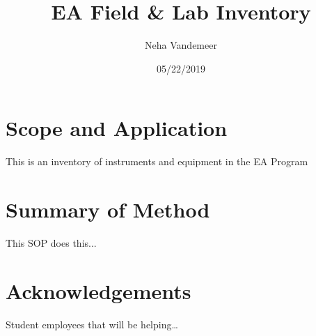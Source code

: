\documentclass[12pt]{../SOP4_alpha}\usepackage[]{graphicx}\usepackage[]{color}
\title{EA Field \& Lab Inventory}
\date{05/22/2019}
\author{Neha Vandemeer}
\begin{document}
\maketitle

\section{Scope and Application}

\NP This is an inventory of instruments and equipment in the EA Program

\section{Summary of Method}

\NP This SOP does this...

\tableofcontents

\newpage

\section{Acknowledgements}

Student employees that will be helping\ldots








\end{document}

